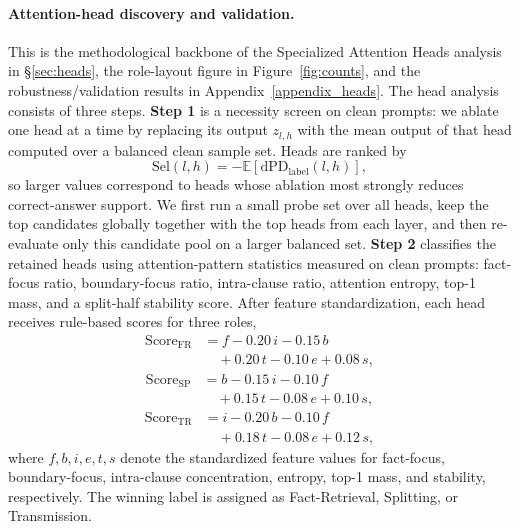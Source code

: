 \documentclass[11pt]{article}
\begin{document}
\paragraph{Attention-head discovery and validation.}
This is the methodological backbone of the Specialized Attention Heads analysis in §\ref{sec:heads}, the role-layout figure in Figure~\ref{fig:counts}, and the robustness/validation results in Appendix~\ref{appendix_heads}.
The head analysis consists of three steps. \textbf{Step 1} is a necessity screen on clean prompts: we ablate one head at a time by replacing its output $z_{l,h}$ with the mean output of that head computed over a balanced clean sample set. Heads are ranked by
\begin{equation}
\mathrm{Sel}(l,h) = -\mathbb{E}[\mathrm{dPD}_{\mathrm{label}}(l,h)],
\end{equation}
so larger values correspond to heads whose ablation most strongly reduces correct-answer support. We first run a small probe set over all heads, keep the top candidates globally together with the top heads from each layer, and then re-evaluate only this candidate pool on a larger balanced set.
\textbf{Step 2} classifies the retained heads using attention-pattern statistics measured on clean prompts: fact-focus ratio, boundary-focus ratio, intra-clause ratio, attention entropy, top-1 mass, and a split-half stability score. After feature standardization, each head receives rule-based scores for three roles,
\begin{equation}
\begin{split}
\mathrm{Score}_{\mathrm{FR}}
&= f - 0.20\,i - 0.15\,b \\
&\quad + 0.20\,t - 0.10\,e + 0.08\,s,
\end{split}
\end{equation}
\begin{equation}
\begin{split}
\mathrm{Score}_{\mathrm{SP}}
&= b - 0.15\,i - 0.10\,f \\
&\quad + 0.15\,t - 0.08\,e + 0.10\,s,
\end{split}
\end{equation}
\begin{equation}
\begin{split}
\mathrm{Score}_{\mathrm{TR}}
&= i - 0.20\,b - 0.10\,f \\
&\quad + 0.18\,t - 0.08\,e + 0.12\,s,
\end{split}
\end{equation}
where $f,b,i,e,t,s$ denote the standardized feature values for fact-focus, boundary-focus, intra-clause concentration, entropy, top-1 mass, and stability, respectively. The winning label is assigned as Fact-Retrieval, Splitting, or Transmission.
\end{document}
